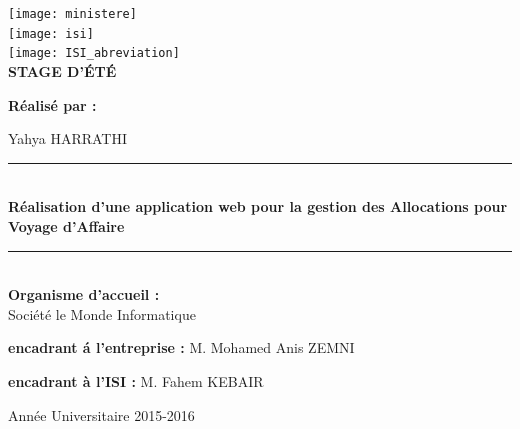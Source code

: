 \begin{titlepage}
\begin{center}

\texttt{[image: ministere]}~\\[1cm]

\texttt{[image: isi]}~\\[1cm]

\texttt{[image: ISI\_abreviation]}~\\[.5cm]

{\huge \bfseries  STAGE D'\'{E}T\'{E}}\\[1cm]

\begin{LARGE}
{\textbf{R\'{e}alis\'{e} par : }}\\
\end{LARGE}
 


\begin{large}
Yahya HARRATHI \\[.5cm]
\end{large}
{\color{MyBleue}\hrule }~\\


{\huge \bfseries R\'{e}alisation d'une application web pour la gestion des Allocations pour Voyage d'Affaire  \\[0.4cm] }

{\color{MyBleue}\hrule}~\\

\textbf{Organisme d'accueil :}\\

Soci\'{e}t\'{e} le Monde Informatique


\textbf{encadrant \'{a} l'entreprise : } 
M. Mohamed Anis ZEMNI

\textbf{encadrant \`{a} l'ISI : } 
M. Fahem KEBAIR

\vfill

{\large Ann\'{e}e Universitaire 2015-2016}

\end{center}
\end{titlepage}